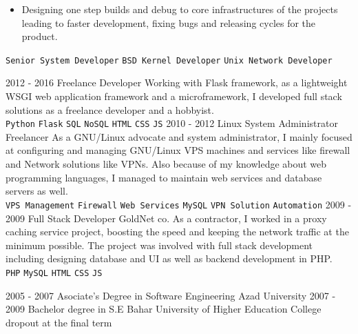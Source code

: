 \documentclass[12pt]{developercv}
\begin{document}
\begin{entrylist}
{\begin{itemize}
				  main development process.
			\item Designing one step builds and debug to core infrastructures of the
				  projects leading to faster development, fixing bugs and releasing
				  cycles for the product. 
		\end{itemize}
		\texttt{Senior System Developer}\slashsep
		\texttt{BSD Kernel Developer}\slashsep
		\texttt{Unix Network Developer}
		}
	\entry
		{2012 - 2016}
		{Freelance Developer}
		{}
		{
		Working with Flask framework, as a lightweight WSGI web application
		framework and a microframework, I developed full stack solutions as a
		freelance developer and a hobbyist. 
		\\
		\texttt{Python}\slashsep
		\texttt{Flask}\slashsep
		\texttt{SQL}\slashsep
		\texttt{NoSQL}\slashsep
		\texttt{HTML}\slashsep
		\texttt{CSS}\slashsep
		\texttt{JS}
		}
	\entry
		{2010 - 2012}
		{Linux System Administrator}
		{Freelancer}
		{
		As a GNU/Linux advocate and system administrator, I mainly focused at
		configuring and managing GNU/Linux VPS machines and services like firewall
		and Network solutions like VPNs. Also because of my knowledge about web
		programming languages, I managed to maintain web services and database
		servers as well.
		\\
		\texttt{VPS Management}\slashsep
		\texttt{Firewall}\slashsep
		\texttt{Web Services}\slashsep
		\texttt{MySQL}\slashsep
		\texttt{VPN Solution}\slashsep
		\texttt{Automation}
		}
	\entry
		{2009 - 2009}
		{Full Stack Developer}
		{GoldNet co.}
		{
		As a contractor, I worked in a proxy caching service project, boosting the
		speed and keeping the network traffic at the minimum possible. The project
		was involved with full stack development including designing database and UI
		as well as backend development in PHP.
		\\
		\texttt{PHP}\slashsep
		\texttt{MySQL}\slashsep
		\texttt{HTML}\slashsep
		\texttt{CSS}\slashsep
		\texttt{JS}
		}
\end{entrylist}



\begin{entrylist}
	\entry
		{2005 - 2007}
		{Asociate's Degree in Software Engineering}
		{Azad University}
		{}
	\entry
		{2007 - 2009}
		{Bachelor degree in S.E}
		{Bahar University of Higher Education}
		{College dropout at the final term}
\end{entrylist}
\end{document}
